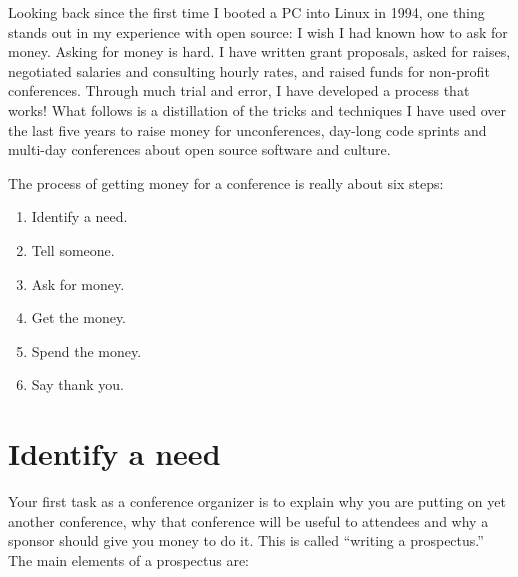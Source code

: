 

Looking back since the first time I booted a PC into Linux in 1994, one thing
stands out in my experience with open source: I wish I had known how to
ask for money.
Asking for money is hard. I have written grant proposals, asked for raises,
negotiated salaries and consulting hourly rates, and raised funds for non-profit
conferences. Through much trial and error, I have developed a process that
works!
What follows is a distillation of the tricks and techniques I have used over the
last five years to raise money for unconferences, day-long code sprints and
multi-day conferences about open source software and culture.

The process of getting money for a conference is really about six steps: 
\begin{enumerate}
 \item Identify a need. 
 \item Tell someone. 
 \item Ask for money.
 \item Get the money.
 \item Spend the money. 
 \item Say thank you.
\end{enumerate}

\section*{Identify a need}

Your first task as a conference organizer is to explain why you are putting on
yet another conference, why that conference will be useful to attendees and why
a sponsor should give you money to do it. This is called ``writing a
prospectus.''
The main elements of a prospectus are: 

